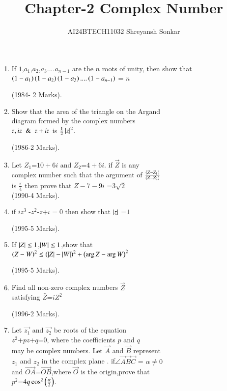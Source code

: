 \documentclass[journal]{IEEEtran}
\theoremstyle{remark}
\begin{document}

\vspace{3cm}

\title{Chapter-2 Complex Number}
\author{AI24BTECH11032 Shreyansh Sonkar
}
\maketitle
\newpage
\bigskip

\renewcommand{\thefigure}{\theenumi}
\renewcommand{\thetable}{\theenumi}
\begin{enumerate}[start=7] %
\item If $1$,$a_1$,$a_2$,$a_3$....$a_{n-1}$
 are the $n$  roots of unity, then show that $\left(1-a_1\right)\left(1-a_2\right)\left(1-a_3\right)....\left(1-a_{n-1}\right)$ = $n$ 
 
\hfill (1984- 2 Marks).\\
\item Show that the area of the triangle on the Argand\\ 
diagram formed by the complex  numbers\\
$z,  iz \And z+  iz$ is $\frac{1}{2}\left\vert z\right\vert^2$.

\hfill (1986-2 Marks).\\
\item Let $Z_1$=$10+6i$ and $Z_2$=$4+6i$. if $\vec{Z}$ is any \\
complex number such that the argument of ${\frac{\left(Z-Z_1\right)}{\left(Z-Z_2
\right)}}$\\
is  ${\frac{\pi}{4}}$ then prove that $Z-7-9i$ =$3\sqrt{2}$\\

\hfill(1990-4 Marks).\\
\item if {$iz^{3}$ -$z^2$-$z$+$\iota=0$} then show that $\left\vert z\right\vert$ =$1$

\hfill(1995-5 Marks).\\
\item If $\left\vert Z\right\vert\le1$,$\left\vert W\right\vert\le1$,show that\\
$\left(Z-W\right)^2\le\left(\left\vert Z\right\vert-\left\vert W\right\vert\right)^2+\left(\arg Z-\arg W\right)^2$ 

\hfill(1995-5 Marks). \\
\item Find all non-zero complex numbers $\vec{Z}$ \\
satisfying $\bar Z$=$ iZ^2 $ 

\hfill(1996-2 Marks).\\
\item Let $\vec{z_1}$  and $\vec{z_2}$ be roots of the equation \\
$z^2$+$pz$+$q$=$0$, where the coefficients $p$ and $q$\\
may be complex numbers. Let $\Vec{A}$ and $\Vec{B}$ represent \\
$z_1$ and $z_2$ in the complex plane . if$\angle\Vec{A}\Vec{B}\Vec{C}$ = $\alpha \not=0$\\ 
and $\Vec{OA}$=$\Vec{OB}$,where $\vec{O}$ is the origin,prove that \\
$p^2$=$4q\cos^2\left(\frac{\alpha}{2}\right)$. 


\end{enumerate}
\end{document}
